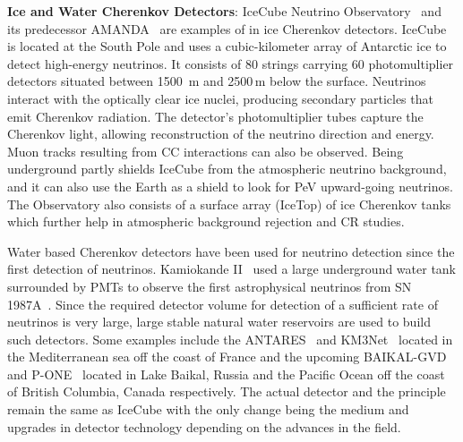 \begin{description}
  \item \textbf{Ice and Water Cherenkov Detectors}: IceCube Neutrino Observatory~\cite{Aartsen_2017} and its predecessor AMANDA~\cite{WISCHNEWSKI1999412} are examples of in ice Cherenkov detectors. IceCube is located at the South Pole and uses a cubic-kilometer array of Antarctic ice to detect high-energy neutrinos. It consists of 80 strings carrying 60 photomultiplier detectors situated between 1500 m and 2500\,m below the surface. Neutrinos interact with the optically clear ice nuclei, producing secondary particles that emit Cherenkov radiation. The detector's photomultiplier tubes capture the Cherenkov light, allowing reconstruction of the neutrino direction and energy. Muon tracks resulting from CC interactions can also be observed. Being underground partly shields IceCube from the atmospheric neutrino background, and it can also use the Earth as a shield to look for PeV upward-going neutrinos. The Observatory also consists of a surface array (IceTop) of ice Cherenkov tanks which further help in atmospheric background rejection and CR studies. 
  
  Water based Cherenkov detectors have been used for neutrino detection since the first detection of neutrinos. Kamiokande II~\cite{Arisaka:1984aoa} used a large underground water tank surrounded by PMTs to observe the first astrophysical neutrinos from SN 1987A~\cite{PhysRevLett.58.1490}. Since the required detector volume for detection of a sufficient rate of neutrinos is very large, large stable natural water reservoirs are used to build such detectors. Some examples include the ANTARES~\cite{CREUSOT2013489} and KM3Net~\cite{MARGIOTTA201483} located in the Mediterranean sea off the coast of France and the upcoming BAIKAL-GVD~\cite{MALYSHKIN2023168117} and P-ONE~\cite{P-ONE:2020ljt} located in Lake Baikal, Russia and the Pacific Ocean off the coast of British Columbia, Canada respectively. The actual detector and the principle remain the same as IceCube with the only change being the medium and upgrades in detector technology depending on the advances in the field. 
  

\end{description}
